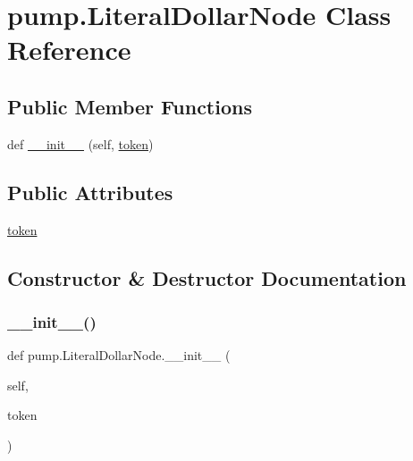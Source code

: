 \hypertarget{classpump_1_1_literal_dollar_node}{}\section{pump.\+Literal\+Dollar\+Node Class Reference}
\label{classpump_1_1_literal_dollar_node}
\subsection*{Public Member Functions}
\begin{DoxyCompactItemize}
\item 
def \mbox{\hyperlink{classpump_1_1_literal_dollar_node_a181cccad8a48f7dfdd0716e427897e0b}{\+\_\+\+\_\+init\+\_\+\+\_\+}} (self, \mbox{\hyperlink{classpump_1_1_literal_dollar_node_ab4c6e209635b8868bcdf0fe8053431c6}{token}})
\end{DoxyCompactItemize}
\subsection*{Public Attributes}
\begin{DoxyCompactItemize}
\item 
\mbox{\hyperlink{classpump_1_1_literal_dollar_node_ab4c6e209635b8868bcdf0fe8053431c6}{token}}
\end{DoxyCompactItemize}


\subsection{Constructor \& Destructor Documentation}
\mbox{\label{classpump_1_1_literal_dollar_node_a181cccad8a48f7dfdd0716e427897e0b}} 
\subsubsection{\texorpdfstring{\_\_init\_\_()}{\_\_init\_\_()}}
{\footnotesize\ttfamily def pump.\+Literal\+Dollar\+Node.\+\_\+\+\_\+init\+\_\+\+\_\+ (\begin{DoxyParamCaption}\item[{}]{self,  }\item[{}]{token }\end{DoxyParamCaption})}



